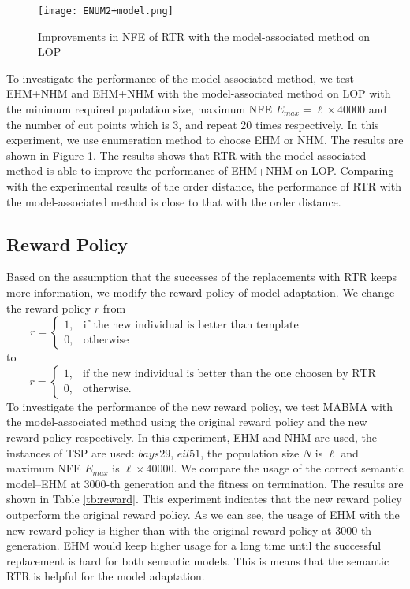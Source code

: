 \begin{figure}[htbp] 
        \centering
        \texttt{[image: ENUM2+model.png]}
        \caption{ Improvements in NFE of RTR with the model-associated method on LOP } 
        \label{fig:enum2_model}
\end{figure}

To investigate the performance of the model-associated method, we test EHM+NHM and EHM+NHM with the model-associated method on LOP with the minimum required population size, maximum NFE $E_{max} = \ell\times 40000$ and the number of cut points which is 3, and repeat 20 times respectively. In this experiment, we use enumeration method to choose EHM or NHM. The results are shown in Figure \ref{fig:enum2_model}. The results shows that RTR with the model-associated method is able to improve the performance of EHM+NHM on LOP. Comparing with the experimental results of the order distance, the performance of RTR with the model-associated method is close to that with the order distance. 

\subsection*{Reward Policy}

Based on the assumption that the successes of the replacements with RTR keeps more information, we modify the reward policy of model adaptation. We change the reward policy $r$ from \[r=
\begin{cases}
1,  & \mbox{if the new individual is better than template~~~~~~~~~~~~~~~~~~~~ }\\
0, & \mbox{otherwise}
\end{cases}
\]to\[r=
\begin{cases}
1,  & \mbox{if the new individual is better than the one choosen by RTR}\\
0, & \mbox{otherwise.}
\end{cases}
\]
To investigate the performance of the new reward policy, we test MABMA with the model-associated method using the original reward policy and the new reward policy respectively. In this experiment, EHM and NHM are used, the instances of TSP are used: $bays29$, $eil51$, the population size $N$ is $\ell$ and maximum NFE $E_{max}$ is $\ell\times 40000$. We compare the usage of the correct semantic model--EHM at $3000$-th generation and the fitness on termination.  The results are shown in Table \ref{tb:reward}.  This experiment indicates that the new reward policy outperform the original reward policy.  As we can see, the usage of EHM with the new reward policy is higher than with the original reward policy at $3000$-th generation. EHM would keep higher usage for a long time until the successful replacement is hard for both semantic models. This is means that the semantic RTR is helpful for the model adaptation.


